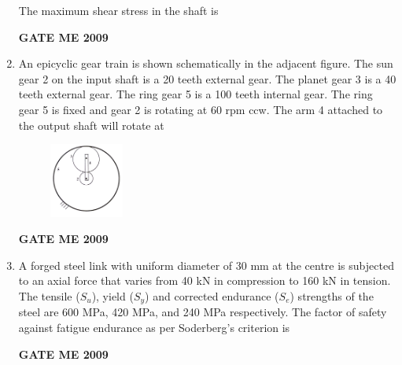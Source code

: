 \documentclass[journal]{IEEEtran}
\begin{document}
\begin{enumerate}[leftmargin=0pt]
The maximum shear stress in the shaft is

\begin{enumerate}
\hfill{\textbf{GATE ME 2009}}
\end{enumerate}




\item An epicyclic gear train is shown schematically in the adjacent figure. The sun gear 2 on the input shaft is a 20 teeth external gear. The planet gear 3 is a 40 teeth external gear. The ring gear 5 is a 100 teeth internal gear. The ring gear 5 is fixed and gear 2 is rotating at 60 rpm ccw. The arm 4 attached to the output shaft will rotate at
\begin{figure}[h] 
  \centering
  \includegraphics[width=0.23\textwidth]{Figs/image (8).png}
  \caption{}
\end{figure}

\begin{enumerate}
\hfill{\textbf{GATE ME 2009}}
\end{enumerate}

\item A forged steel link with uniform diameter of 30 mm at the centre is subjected to an axial force that varies from 40 kN in compression to 160 kN in tension. The tensile ($S_u$), yield ($S_y$) and corrected endurance ($S_e$) strengths of the steel are 600 MPa, 420 MPa, and 240 MPa respectively. The factor of safety against fatigue endurance as per Soderberg's criterion is
\begin{enumerate}
\hfill{\textbf{GATE ME 2009}}
\end{enumerate}


\end{enumerate}
\end{document}

